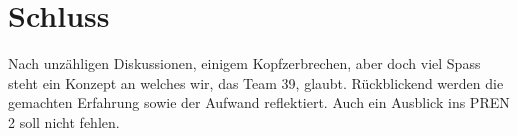 \section{Schluss}
Nach unzähligen Diskussionen, einigem Kopfzerbrechen, aber doch viel Spass steht ein Konzept an welches wir, das Team 39, glaubt. Rückblickend werden die gemachten Erfahrung sowie der Aufwand reflektiert. Auch ein Ausblick ins PREN 2 soll nicht fehlen.







